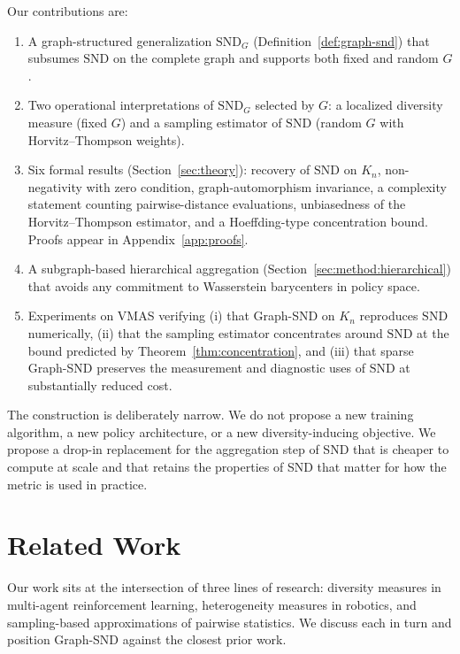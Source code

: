 \documentclass[11pt]{article}
\theoremstyle{plain}
\theoremstyle{definition}
\theoremstyle{remark}
\newcommand{\SND}{\ensuremath{\mathrm{SND}}}
\newcommand{\SNDG}{\mathrm{SND}_{G}}
\begin{document}
Our contributions are:
\begin{enumerate}
\item A graph-structured generalization $\SNDG$
  (Definition~\ref{def:graph-snd}) that subsumes $\SND$ on the
  complete graph and supports both fixed and random $G$.
\item Two operational interpretations of $\SNDG$ selected by $G$: a
  localized diversity measure (fixed $G$) and a sampling estimator of
  $\SND$ (random $G$ with Horvitz--Thompson weights).
\item Six formal results (Section~\ref{sec:theory}): recovery of
  $\SND$ on $K_n$, non-negativity with zero condition,
  graph-automorphism invariance, a complexity statement counting
  pairwise-distance evaluations, unbiasedness of the Horvitz--Thompson
  estimator, and a Hoeffding-type concentration bound. Proofs appear
  in Appendix~\ref{app:proofs}.
\item A subgraph-based hierarchical aggregation
  (Section~\ref{sec:method:hierarchical}) that avoids any commitment
  to Wasserstein barycenters in policy space.
\item Experiments on VMAS \citep{bettini2022vmas} verifying (i) that
  Graph-SND on $K_n$ reproduces $\SND$ numerically, (ii) that the sampling estimator concentrates around $\SND$ at the bound predicted by
Theorem~\ref{thm:concentration}, and (iii) that sparse Graph-SND
  preserves the measurement and diagnostic uses of $\SND$ at
  substantially reduced cost.
\end{enumerate}

The construction is deliberately narrow. We do not propose a new
training algorithm, a new policy architecture, or a new
diversity-inducing objective. We propose a drop-in replacement for the
aggregation step of SND that is cheaper to compute at scale and that
retains the properties of SND that matter for how the metric is used
in practice.

\section{Related Work}
\label{sec:related}

Our work sits at the intersection of three lines of research:
diversity measures in multi-agent reinforcement learning,
heterogeneity measures in robotics, and sampling-based approximations
of pairwise statistics. We discuss each in turn and position Graph-SND
against the closest prior work.
\end{document}
